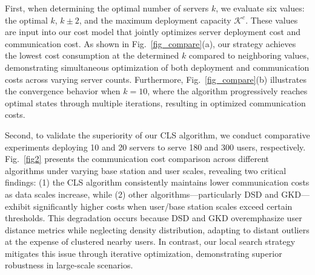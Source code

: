 \documentclass[10pt, conference, letterpaper]{IEEEtran}
\begin{document}
First, when determining the optimal number of servers $k$, we evaluate six values: the optimal $k$, $k \pm 2$, and the maximum deployment capacity $\mathcal{K}^c$. These values are input into our cost model that jointly optimizes server deployment cost and communication cost. As shown in Fig.~\ref{fig_compare}(a), our strategy achieves the lowest cost consumption at the determined $k$ compared to neighboring values, demonstrating simultaneous optimization of both deployment and communication costs across varying server counts. Furthermore, Fig.~\ref{fig_compare}(b) illustrates the convergence behavior when $k=10$, where the algorithm progressively reaches optimal states through multiple iterations, resulting in optimized communication costs.

Second, to validate the superiority of our CLS algorithm, we conduct comparative experiments deploying 10 and 20 servers to serve 180 and 300 users, respectively. Fig.~\ref{fig2} presents the communication cost comparison across different algorithms under varying base station and user scales, revealing two critical findings: (1) the CLS algorithm consistently maintains lower communication costs as data scales increase, while (2) other algorithms—particularly DSD and GKD—exhibit significantly higher costs when user/base station scales exceed certain thresholds. This degradation occurs because DSD and GKD overemphasize user distance metrics while neglecting density distribution, adapting to distant outliers at the expense of clustered nearby users. In contrast, our local search strategy mitigates this issue through iterative optimization, demonstrating superior robustness in large-scale scenarios.
\end{document}
